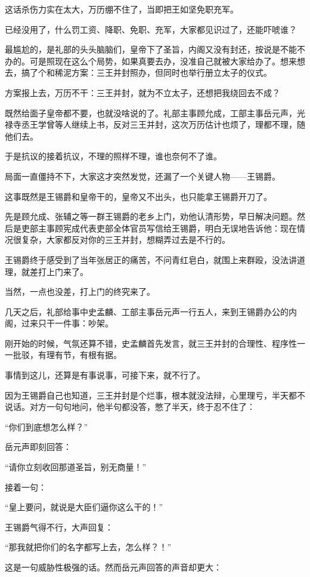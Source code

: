 \begin{multicols}{\theparacolNo}
		这话杀伤力实在太大，万历绷不住了，当即把王如坚免职充军。

		已经没用了，什么罚工资、降职、免职、充军，大家都见识过了，还能吓唬谁？

		最尴尬的，是礼部的头头脑脑们，皇帝下了圣旨，内阁又没有封还，按说是不能不办的。可是照现在这么个局势，如果真要去办，没准自己就被大家给办了。想来想去，搞了个和稀泥方案：三王并封照办，但同时也举行册立太子的仪式。

		方案报上去，万历不干：三王并封，就为不立太子，还想把我绕回去不成？

		既然给面子皇帝都不要，也就没啥说的了。礼部主事顾允成，工部主事岳元声，光禄寺丞王学曾等人继续上书，反对三王并封，这次万历估计也烦了，理都不理，随他们去。

		于是抗议的接着抗议，不理的照样不理，谁也奈何不了谁。

		局面一直僵持不下，大家这才突然发觉，还漏了一个关键人物——王锡爵。

		这事既然是王锡爵和皇帝干的，皇帝又不出头，也只能拿王锡爵开刀了。

		先是顾允成、张辅之等一群王锡爵的老乡上门，劝他认清形势，早日解决问题。然后是吏部主事顾宪成代表吏部全体官员写信给王锡爵，明白无误地告诉他：现在情况很复杂，大家都反对你的三王并封，想糊弄过去是不行的。

		王锡爵终于感受到了当年张居正的痛苦，不问青红皂白，就围上来群殴，没法讲道理，就差打上门来了。

		当然，一点也没差，打上门的终究来了。

		几天之后，礼部给事中史孟麟、工部主事岳元声一行五人，来到王锡爵办公的内阁，过来只干一件事：吵架。

		刚开始的时候，气氛还算不错，史孟麟首先发言，就三王并封的合理性、程序性一一批驳，有理有节，有根有据。

		事情到这儿，还算是有事说事，可接下来，就不行了。

		因为王锡爵自己也知道，三王并封是个烂事，根本就没法辩，心里理亏，半天都不说话。对方一句句地问，他半句都没答，憋了半天，终于忍不住了：

		“你们到底想怎么样？”

		岳元声即刻回答：

		“请你立刻收回那道圣旨，别无商量！”

		接着一句：

		“皇上要问，就说是大臣们逼你这么干的！”

		王锡爵气得不行，大声回复：

		“那我就把你们的名字都写上去，怎么样？！”

		这是一句威胁性极强的话。然而岳元声回答的声音却更大：


\end{multicols}
